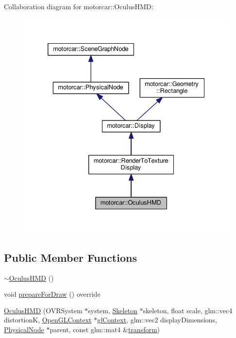 Collaboration diagram for motorcar\-:\-:Oculus\-H\-M\-D\-:
\nopagebreak
\begin{figure}[H]
\begin{center}
\leavevmode
\includegraphics[width=332pt]{classmotorcar_1_1OculusHMD__coll__graph}
\end{center}
\end{figure}
\subsection*{Public Member Functions}
\begin{DoxyCompactItemize}
\item 
\hyperlink{classmotorcar_1_1OculusHMD_a69e38487ae0a51504663dd942fbb068e}{$\sim$\-Oculus\-H\-M\-D} ()
\item 
void \hyperlink{classmotorcar_1_1OculusHMD_ae9834ea50d728809532b7a48f7ed1738}{prepare\-For\-Draw} () override
\item 
\hyperlink{classmotorcar_1_1OculusHMD_a4f64cac13d749bf6d0cc9ca1f94297bb}{Oculus\-H\-M\-D} (O\-V\-R\-System $\ast$system, \hyperlink{classmotorcar_1_1Skeleton}{Skeleton} $\ast$skeleton, float scale, glm\-::vec4 distortion\-K, \hyperlink{classmotorcar_1_1OpenGLContext}{Open\-G\-L\-Context} $\ast$\hyperlink{classmotorcar_1_1Display_a884dd0b78dbecee82a33eb6d26a2a403}{gl\-Context}, glm\-::vec2 display\-Dimensions, \hyperlink{classmotorcar_1_1PhysicalNode}{Physical\-Node} $\ast$parent, const glm\-::mat4 \&\hyperlink{classmotorcar_1_1SceneGraphNode_ad96e79fdd739ac8223a3128003be391a}{transform})
\end{DoxyCompactItemize}
